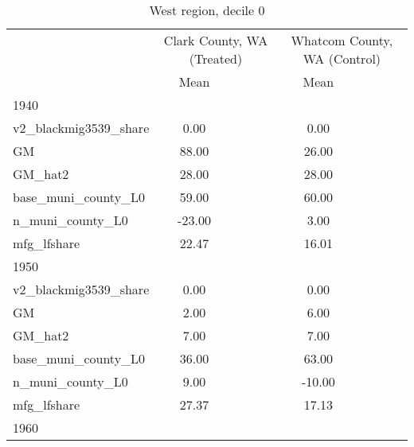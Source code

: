 \begin{table}[htbp]\centering
\def\sym#1{\ifmmode^{#1}\else\(^{#1}\)\fi}
\caption{West region, decile 0 \label{tab1}}
\begin{tabular}{l*{2}{ccc}}
\toprule
                    &\multicolumn{3}{c}{Clark County, WA (Treated)}&\multicolumn{3}{c}{Whatcom County, WA (Control)}\\
                    &        Mean&            &            &        Mean&            &            \\
\midrule
1940                &            &            &            &            &            &            \\
v2\_blackmig3539\_share&        0.00&            &            &        0.00&            &            \\
GM                  &       88.00&            &            &       26.00&            &            \\
GM\_hat2             &       28.00&            &            &       28.00&            &            \\
base\_muni\_county\_L0 &       59.00&            &            &       60.00&            &            \\
n\_muni\_county\_L0    &      -23.00&            &            &        3.00&            &            \\
mfg\_lfshare         &       22.47&            &            &       16.01&            &            \\
\midrule
1950                &            &            &            &            &            &            \\
v2\_blackmig3539\_share&        0.00&            &            &        0.00&            &            \\
GM                  &        2.00&            &            &        6.00&            &            \\
GM\_hat2             &        7.00&            &            &        7.00&            &            \\
base\_muni\_county\_L0 &       36.00&            &            &       63.00&            &            \\
n\_muni\_county\_L0    &        9.00&            &            &      -10.00&            &            \\
mfg\_lfshare         &       27.37&            &            &       17.13&            &            \\
\midrule
1960                &            &            &            &            &            &            \\

\end{tabular}
\end{table}
